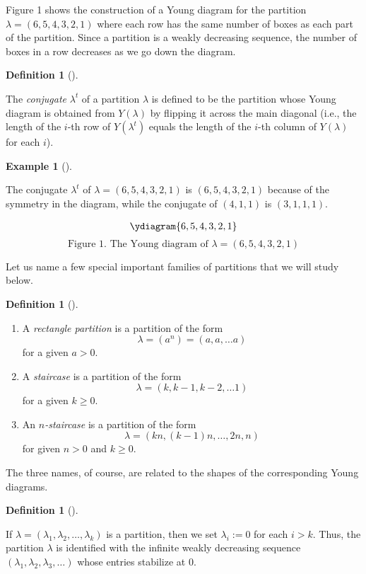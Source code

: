\documentclass[numbers=enddot,12pt,final,onecolumn,notitlepage]{scrartcl}%
\theoremstyle{definition}
\newtheorem{defi}[theo]{Definition}
\newenvironment{definition}[1][]
{\begin{defi}[#1]\begin{leftbar}}
{\end{leftbar}\end{defi}}
\newtheorem{exam}[theo]{Example}
\newenvironment{example}[1][]
{\begin{exam}[#1]\begin{leftbar}}
{\end{leftbar}\end{exam}}
\newcommand{\tup}[1]{\left( #1 \right)}
\renewcommand{\geq}{\geqslant}
\theoremstyle{plainsl}
\begin{document}
Figure 1 shows the construction of a Young diagram for the partition $\lambda = (6,5,4,3,2,1)$ where each row has the same number of boxes as each part of the partition. Since a partition is a weakly decreasing sequence, the number of boxes in a row decreases as we go down the diagram.

\begin{definition}
The \emph{conjugate} $\lambda^t$ of a partition $\lambda$ is defined to be the partition whose Young diagram is obtained from $Y\tup{\lambda}$ by flipping it across the main diagonal (i.e., the length of the $i$-th row of $Y\tup{\lambda^t}$ equals the length of the $i$-th column of $Y\tup{\lambda}$ for each $i$).
\end{definition} 

\begin{example}
The conjugate $\lambda^t$ of $\lambda = (6,5,4,3,2,1)$ is $(6,5,4,3,2,1)$ because of the symmetry in the diagram, while the conjugate of $(4,1,1)$ is $(3,1,1,1)$. 
\end{example}

\begin{align*}
\ydiagram{6,5,4,3,2,1} 
\end{align*}
\[
\text{Figure 1. The Young diagram of $\lambda = (6,5,4,3,2,1)$}
\]

Let us name a few special important families of partitions that we will study below.

\begin{definition}
\begin{enumerate}
    \item A \emph{rectangle partition} is a partition of the form 
\[\lambda = (a^n) = (a,a, \ldots a)\]
for a given $a > 0$.
    \item A \emph{staircase} is a partition of the form 
\[\lambda = (k, k-1, k-2, \ldots 1)\]
for a given $k \geq 0$.
    \item An \emph{$n$-staircase} is a partition of the form 
\[\lambda = (kn, (k-1)n, \ldots, 2n,  n)\]
for given $n > 0$ and $k \geq 0$.
\end{enumerate}

\end{definition}

The three names, of course, are related to the shapes of the corresponding Young diagrams.

\begin{definition}
If $\lambda = \tup{\lambda_1, \lambda_2, \ldots, \lambda_k}$ is
a partition, then we set $\lambda_i := 0$ for each $i > k$.
Thus, the partition $\lambda$ is identified with the infinite
weakly decreasing
sequence $\tup{\lambda_1, \lambda_2, \lambda_3, \ldots}$
whose entries stabilize at $0$.
\end{definition}
\end{document}
